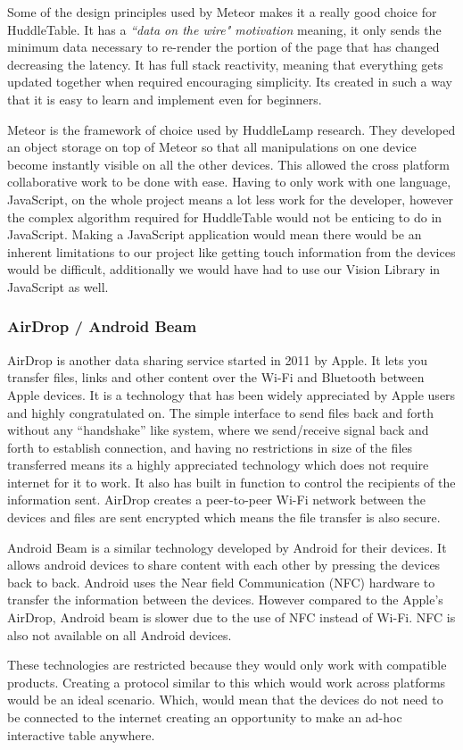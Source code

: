Some of the design principles used by Meteor makes it a really good
choice for HuddleTable. It has a \emph{``data on the wire" motivation} meaning,
it only sends the minimum data necessary to re-render the portion
of the page that has changed decreasing the latency. It has full
stack reactivity\cite{meteor-wiki}, meaning that everything gets updated
together when required encouraging simplicity. Its
created in such a way that it is easy to learn and implement even
for beginners.
 
Meteor is the framework of choice used by HuddleLamp research.
They developed an object storage on top of Meteor so that all manipulations
on one device become instantly visible on all the other devices. This
allowed the cross platform collaborative work to be done with ease.
Having to only work with one language, JavaScript, on the whole project
means a lot less work for the developer, however the complex algorithm
required for HuddleTable would not be enticing to do in JavaScript. Making a JavaScript application would mean there would be an inherent limitations to our project like getting touch information from the devices would be difficult, additionally we would have had to use our Vision Library in JavaScript as well.
 
 
\subsubsection{AirDrop / Android Beam}
 
AirDrop\cite{airdrop} is another data sharing service started in
2011 by Apple. It lets you transfer files, links and other content
over the Wi-Fi and Bluetooth between Apple devices. It is a technology
that has been widely appreciated by Apple users and highly congratulated
on. The simple interface to send files back and forth without any
``handshake'' like system, where we send/receive signal back and forth to establish connection, and having no restrictions in size of
the files transferred means its a highly appreciated technology which
does not require internet for it to work. It also has built in function
to control the recipients of the information sent. AirDrop creates
a peer-to-peer Wi-Fi network between the devices and files are
sent encrypted which means the file transfer is also secure.
 
Android Beam\cite{android-beam} is a similar technology developed
by Android for their devices. It allows android devices to share content
with each other by pressing the devices back to back. Android uses
the Near field Communication (NFC) hardware to transfer the information
between the devices. However compared to the Apple's AirDrop, Android
beam is slower due to the use of NFC instead of Wi-Fi. NFC is also not
available on all Android devices.
 
These technologies are restricted because they would only work with
compatible products. Creating a protocol similar to this which would work
across platforms would be an ideal scenario. Which, would mean that the
devices do not need to be connected to the internet creating an
opportunity to make an ad-hoc interactive table anywhere.
 

